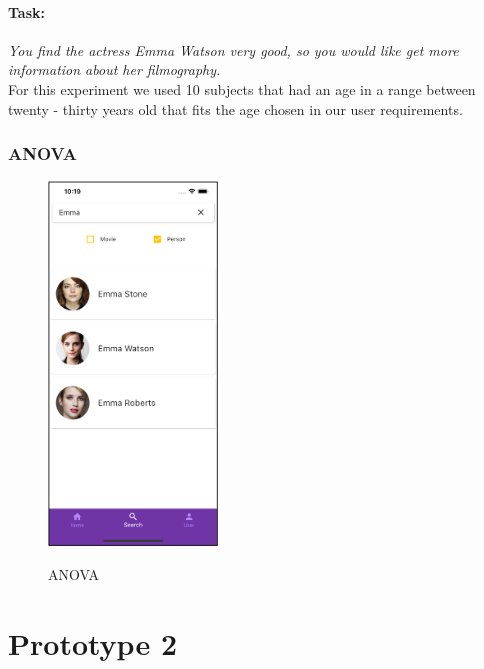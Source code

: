 \documentclass[12pt, a4paper]{article}
\numberwithin{figure}{section}
\begin{document}
\paragraph{Task:} \textit{You find the actress Emma Watson very good, so you would like
get more information about her filmography.}\\ %

\noindent %
For this experiment we used 10 subjects that had an age in a range between twenty - thirty years old that 
fits the age chosen in our user requirements.

\subsubsection{ANOVA}

\begin{center}
	\begin{figure}[H]
		\centering
		\includegraphics[width=0.4\textwidth]{images/experiment/searchCheckBox.png}\\
		\caption{ANOVA}
		\label{fig:anova}
	\end{figure}
\end{center}



\newpage

\section{Prototype 2}
\end{document}
